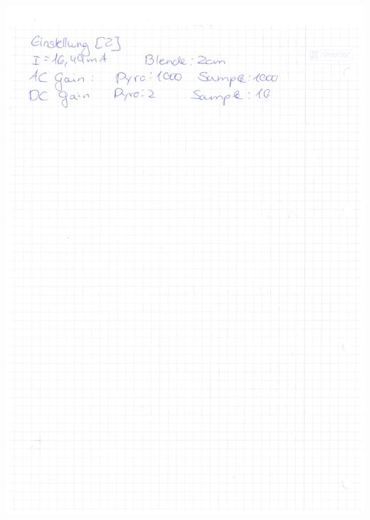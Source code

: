 \documentclass[12pt]{article}
\begin{document}
\begin{minipage}{\textwidth}
	\centering
	\includegraphics[width=\textwidth]{figures/Buch2.pdf}
\end{minipage}
\end{document}
